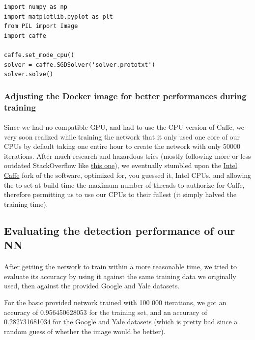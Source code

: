 \documentclass[french]{article}
\begin{document}
\begin{verbatim}
import numpy as np
import matplotlib.pyplot as plt
from PIL import Image
import caffe

caffe.set_mode_cpu()
solver = caffe.SGDSolver('solver.prototxt')
solver.solve()
\end{verbatim}

\subsubsection{Adjusting the Docker image for better performances during training}

\paragraph{} Since we had no compatible GPU, and had to use the CPU version of Caffe, we very soon realized while training the network that it only used one core of our CPUs by default taking one entire hour to create the network with only 50000 iterations. After much research and hazardous tries (mostly following more or less outdated StackOverflow like \href{https://stackoverflow.com/questions/31395729/how-to-enable-multithreading-with-caffe}{this one}), we eventually stumbled upon the \href{https://github.com/intel/caffe}{Intel Caffe} fork of the software, optimized for, you guessed it, Intel CPUs, and allowing the to set at build time the maximum number of threads to authorize for Caffe, therefore permitting us to use our CPUs to their fullest (it simply halved the training time).

\subsection{Evaluating the detection performance of our NN}

\paragraph{} After getting the network to train within a more reasonable time, we tried to evaluate its accuracy by using it against the same training data we originally used, then against the provided Google and Yale datasets.

For the basic provided network trained with 100 000 iterations, we got an accuracy of 0.956450628053 for the training set, and an accuracy of 0.282731681034 for the Google and Yale datasets (which is pretty bad since a random guess of whether the image would be better).
\end{document}
